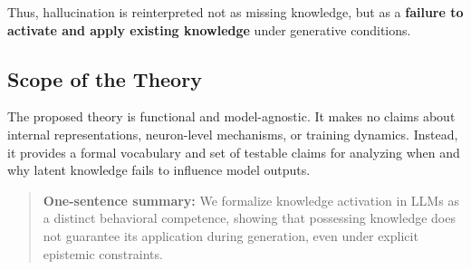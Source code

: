 Thus, hallucination is reinterpreted not as missing knowledge, but as a \textbf{failure to activate and apply existing knowledge} under generative conditions.


\subsection{Scope of the Theory}

The proposed theory is functional and model-agnostic. It makes no claims about internal representations, neuron-level mechanisms, or training dynamics. Instead, it provides a formal vocabulary and set of testable claims for analyzing when and why latent knowledge fails to influence model outputs.

\begin{quote}
\textbf{One-sentence summary:} We formalize knowledge activation in LLMs as a distinct behavioral competence, showing that possessing knowledge does not guarantee its application during generation, even under explicit epistemic constraints.
\end{quote}


%
%
%
%
